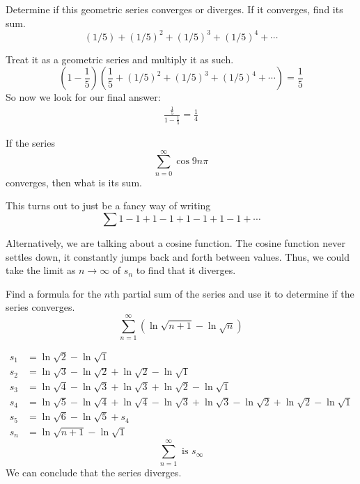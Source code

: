 \begin{ex}
  Determine if this geometric series converges or diverges. If it converges,
  find its sum.
  \[ (1/5) + (1/5)^2 + (1/5)^3 + (1/5)^4 + \cdots \]
  \begin{sol}
    Treat it as a geometric series and multiply it as such.
    \[ \left( 1-\frac{1}{5} \right) \left(\frac{1}{5} + (1/5)^2 + (1/5)^3 + (1/5)^4 +
      \cdots \right) = \frac{1}{5} \]
    So now we look for our final answer:
    \begin{align*}
      \frac{\frac{1}{5}}{1-\frac{1}{5}} = \frac{1}{4}
    \end{align*}
  \end{sol}
\end{ex}
\begin{ex}
  If the series \[ \sum^{\infty}_{n=0} \cos{9n\pi} \] converges, then what is
  its sum.
  \begin{sol}
    This turns out to just be a fancy way of writing
    \[ \sum 1-1+1-1+1-1+1-1+\cdots \]

    Alternatively, we are talking about a cosine function. The cosine function
    never settles down, it constantly jumps back and forth between values. Thus,
    we could take the limit as \( n \to \infty\) of \(s_n\) to find that it
    diverges.
  \end{sol}
\end{ex}
\begin{ex}
  Find a formula for the \(n\)th partial sum of the series and use it to
  determine if the series converges.
  \[ \sum_{n=1}^\infty (\ln \sqrt{n+1} - \ln \sqrt{n}) \]
  \begin{sol}
    \begin{align*}
      s_1 &= \ln \sqrt{2} - \ln \sqrt 1 \\
      s_2 &= \ln \sqrt 3 - \ln \sqrt 2 + \ln \sqrt 2 - \ln \sqrt 1 \\
      s_3 &= \ln \sqrt 4 - \ln \sqrt 3 + \ln \sqrt 3 + \ln \sqrt 2 - \ln \sqrt 1
      \\
      s_4 &= \ln \sqrt 5 - \ln \sqrt 4 + \ln \sqrt 4 - \ln \sqrt 3 + \ln \sqrt 3
      - \ln \sqrt 2 + \ln \sqrt 2 - \ln \sqrt 1 \\
      s_5 &= \ln \sqrt 6 - \ln \sqrt 5 + s_4 \\
      s_n &= \ln \sqrt{n+1}-\ln \sqrt{1}
    \end{align*}
    \[ \sum^\infty_{n=1} \text{ is } s_\infty \]
    We can conclude that the series diverges.
  \end{sol}
\end{ex}
